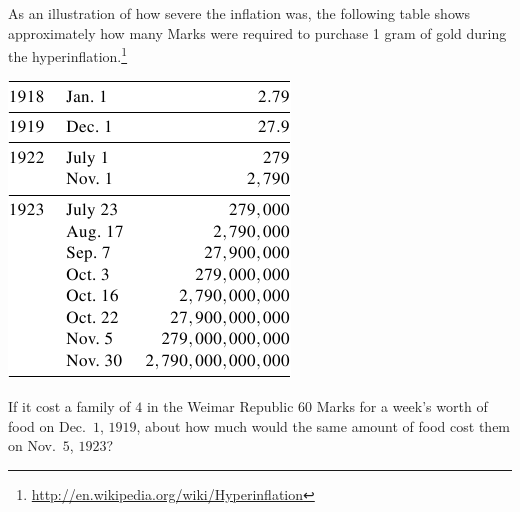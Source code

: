 \documentclass{ximera}
\begin{document}
As an illustration of how severe the inflation was, the following table shows approximately how many Marks were required to purchase 1 gram of gold during the hyperinflation.\footnote{\href{http://en.wikipedia.org/wiki/Hyperinflation}{http://en.wikipedia.org/wiki/Hyperinflation}}

\begin{image}
\includegraphics{InflationTable1.png}
\end{image}

\begin{question}
If it cost a family of $4$ in the Weimar Republic $60$ Marks for a week's worth of food on Dec.\ $1$, $1919$, about how much would the same amount of food cost them on Nov.\ $5$, $1923$?

\begin{multipleChoice}
\end{multipleChoice}
	
\end{question}
\end{document}
